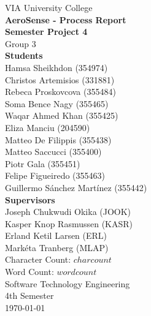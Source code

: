 \thispagestyle{empty}
\vspace*{0.15\textheight}
\begin{center}
    {\Large VIA University College}\\[2em]
    {\huge \textbf{AeroSense - Process Report}}\\[0.5em]
    {\Large \textbf{Semester Project 4}}\\[0.5em]
    {\Large Group 3}\\[3em]
    {\large \textbf{Students}}\\[0.5em]
    {\large Hamsa Sheikhdon (354974)}\\[0.5em]
    {\large Christos Artemisios (331881)}\\[0.5em]
    {\large Rebeca Proskovcova (355484)}\\[0.5em]
    {\large Soma Bence Nagy (355465)}\\[0.5em]
    {\large Waqar Ahmed Khan (355425)}\\[0.5em]
    {\large Eliza Manciu (204590)}\\[0.5em]
    {\large Matteo De Filippis (355438)}\\[0.5em]
    {\large Matteo Saccucci (355400)}\\[0.5em]
    {\large Piotr Gala (355451)}\\[0.5em]
    {\large Felipe Figueiredo (355463)}\\[0.5em]
    {\large Guillermo Sánchez Martínez (355442)}\\[2em]
    {\large \textbf{Supervisors}}\\[0.5em]
    {\large Joseph Chukwudi Okika (JOOK)}\\[0.5em]
    {\large Kasper Knop Rasmussen (KASR)}\\[0.5em]
    {\large Erland Ketil Larsen (ERL)}\\[0.5em]
    {\large Markéta Tranberg (MLAP)}\\[2em]
    {\large Character Count: $charcount$}\\[0.5em]
    {\large Word Count: $wordcount$}\\[2em]
    {\Large Software Technology Engineering}\\[1em]
    {\Large 4th Semester}\\[1em]
    {\large \today}\\[1em]
\end{center}
\vfill
\clearpage